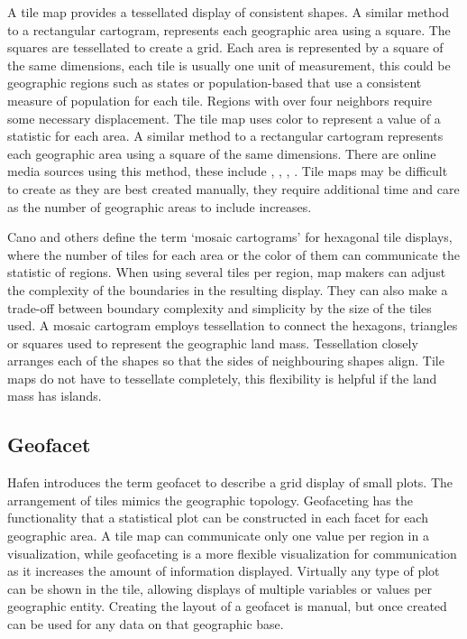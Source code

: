\documentclass{monashthesis}
\begin{document}
A tile map provides a tessellated display of consistent shapes. A similar method to a rectangular cartogram, represents each geographic area using a square. The squares are tessellated to create a grid. Each area is represented by a square of the same dimensions, each tile is usually one unit of measurement, this could be geographic regions such as states or population-based that use a consistent measure of population for each tile. Regions with over four neighbors require some necessary displacement. The tile map uses color to represent a value of a statistic for each area. A similar method to a rectangular cartogram represents each geographic area using a square of the same dimensions. There are online media sources using this method, these include \autocite{NPR}, \autocite{FiveThirtyEight}, \autocite{WSJ}, \autocite{WP}. Tile maps may be difficult to create as they are best created manually, they require additional time and care as the number of geographic areas to include increases.

Cano and others \autocite{MDAC} define the term `mosaic cartograms' for hexagonal tile displays, where the number of tiles for each area or the color of them can communicate the statistic of regions. When using several tiles per region, map makers can adjust the complexity of the boundaries in the resulting display. They can also make a trade-off between boundary complexity and simplicity by the size of the tiles used. A mosaic cartogram employs tessellation to connect the hexagons, triangles or squares used to represent the geographic land mass. Tessellation closely arranges each of the shapes so that the sides of neighbouring shapes align. Tile maps do not have to tessellate completely, this flexibility is helpful if the land mass has islands.

\hypertarget{geofacet}{%
\subsection{Geofacet}\label{geofacet}}

Hafen \autocite{IGF} introduces the term geofacet to describe a grid display of small plots. The arrangement of tiles mimics the geographic topology. Geofaceting has the functionality that a statistical plot can be constructed in each facet for each geographic area. A tile map can communicate only one value per region in a visualization, while geofaceting is a more flexible visualization for communication as it increases the amount of information displayed. Virtually any type of plot can be shown in the tile, allowing displays of multiple variables or values per geographic entity. Creating the layout of a geofacet is manual, but once created can be used for any data on that geographic base.
\end{document}
